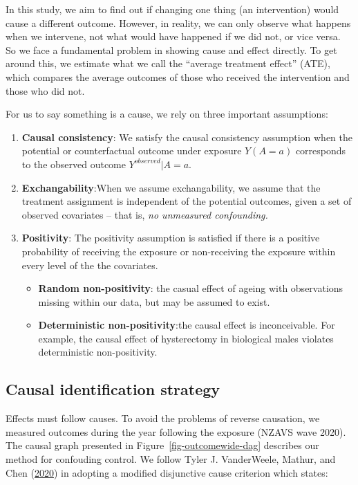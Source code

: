 \documentclass[
  singlecolumn]{report}
\begin{document}
In this study, we aim to find out if changing one thing (an
intervention) would cause a different outcome. However, in reality, we
can only observe what happens when we intervene, not what would have
happened if we did not, or vice versa. So we face a fundamental problem
in showing cause and effect directly. To get around this, we estimate
what we call the ``average treatment effect'' (ATE), which compares the
average outcomes of those who received the intervention and those who
did not.

For us to say something is a cause, we rely on three important
assumptions:

\begin{enumerate}
\def\labelenumi{\arabic{enumi}.}
\item
  \textbf{Causal consistency}: We satisfy the causal consistency
  assumption when the potential or counterfactual outcome under exposure
  \(Y(A=a)\) corresponds to the observed outcome \(Y^{observed}|A=a\).
\item
  \textbf{Exchangability}:When we assume exchangability, we assume that
  the treatment assignment is independent of the potential outcomes,
  given a set of observed covariates -- that is, \emph{no unmeasured
  confounding.}
\item
  \textbf{Positivity}: The positivity assumption is satisfied if there
  is a positive probability of receiving the exposure or non-receiving
  the exposure within every level of the the covariates.

  \begin{itemize}
  \item
    \textbf{Random non-positivity}: the casual effect of ageing with
    observations missing within our data, but may be assumed to exist.
  \item
    \textbf{Deterministic non-positivity}:the causal effect is
    inconceivable. For example, the causal effect of hysterectomy in
    biological males violates deterministic non-positivity.
  \end{itemize}
\end{enumerate}

\hypertarget{causal-identification-strategy}{%
\subsection{Causal identification
strategy}\label{causal-identification-strategy}}

Effects must follow causes. To avoid the problems of reverse causation,
we measured outcomes during the year following the exposure (NZAVS wave
2020). The causal graph presented in Figure~\ref{fig-outcomewide-dag}
describes our method for confouding control. We follow Tyler J.
VanderWeele, Mathur, and Chen
(\protect\hyperlink{ref-vanderweele2020}{2020}) in adopting a modified
disjunctive cause criterion which states:
\end{document}
